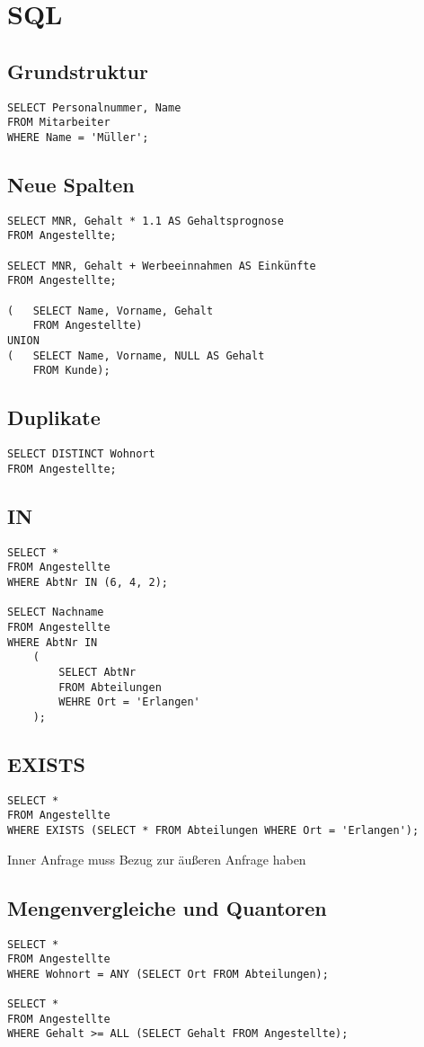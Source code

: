 \section{SQL}
\subsection{Grundstruktur}
\begin{verbatim}
SELECT Personalnummer, Name
FROM Mitarbeiter
WHERE Name = 'Müller';
\end{verbatim}
\subsection{Neue Spalten}
\begin{verbatim}
SELECT MNR, Gehalt * 1.1 AS Gehaltsprognose
FROM Angestellte;

SELECT MNR, Gehalt + Werbeeinnahmen AS Einkünfte
FROM Angestellte;

(	SELECT Name, Vorname, Gehalt
	FROM Angestellte)
UNION
(	SELECT Name, Vorname, NULL AS Gehalt
	FROM Kunde);
\end{verbatim}
\subsection{Duplikate}
\begin{verbatim}
SELECT DISTINCT Wohnort
FROM Angestellte;
\end{verbatim}
\subsection{IN}
\begin{verbatim}
SELECT * 
FROM Angestellte
WHERE AbtNr IN (6, 4, 2);

SELECT Nachname
FROM Angestellte
WHERE AbtNr IN
	(	
		SELECT AbtNr
		FROM Abteilungen
		WEHRE Ort = 'Erlangen'
	);
\end{verbatim}
\subsection{EXISTS}
\begin{verbatim}
SELECT * 
FROM Angestellte
WHERE EXISTS (SELECT * FROM Abteilungen WHERE Ort = 'Erlangen'); 
\end{verbatim}
Inner Anfrage muss Bezug zur äußeren Anfrage haben
\subsection{Mengenvergleiche und Quantoren}
\begin{verbatim}
SELECT * 
FROM Angestellte
WHERE Wohnort = ANY (SELECT Ort FROM Abteilungen);

SELECT * 
FROM Angestellte
WHERE Gehalt >= ALL (SELECT Gehalt FROM Angestellte);
\end{verbatim}
